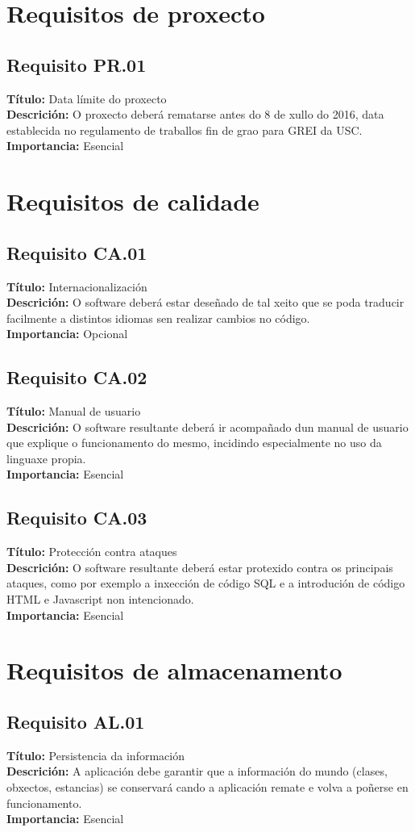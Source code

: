 \section{Requisitos de proxecto}
\subsection{Requisito PR.01}
{\bf Título:} Data límite do proxecto\\
{\bf Descrición:} O proxecto deberá rematarse antes do 8 de xullo do 2016, data establecida no regulamento de traballos fin de grao para GREI da USC.\\
{\bf Importancia:} Esencial

\section{Requisitos de calidade}
\subsection{Requisito CA.01}
{\bf Título:} Internacionalización\\
{\bf Descrición:} O software deberá estar deseñado de tal xeito que se poda traducir facilmente a distintos idiomas sen realizar cambios no código.\\
{\bf Importancia:} Opcional

\subsection{Requisito CA.02}
{\bf Título:} Manual de usuario\\
{\bf Descrición:} O software resultante deberá ir acompañado dun manual de usuario que explique o funcionamento do mesmo, incidindo especialmente no uso da linguaxe propia.\\
{\bf Importancia:} Esencial

\subsection{Requisito CA.03}
{\bf Título:} Protección contra ataques\\
{\bf Descrición:} O software resultante deberá estar protexido contra os principais ataques, como por exemplo a inxección de código SQL e a introdución de código HTML e Javascript non intencionado.\\
{\bf Importancia:} Esencial

\section{Requisitos de almacenamento}
\subsection{Requisito AL.01}
{\bf Título:} Persistencia da información\\
{\bf Descrición:} A aplicación debe garantir que a información do mundo (clases, obxectos, estancias) se conservará cando a aplicación remate e volva a poñerse en funcionamento.\\
{\bf Importancia:} Esencial
